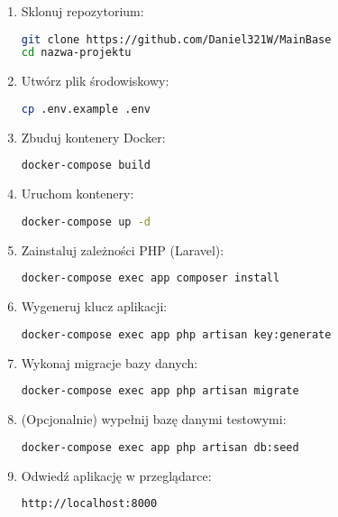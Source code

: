\documentclass[a4paper,12pt]{article}
\begin{document}
\begin{enumerate}
  \item Sklonuj repozytorium:
\begin{lstlisting}[language=bash]
git clone https://github.com/Daniel321W/MainBase
cd nazwa-projektu
\end{lstlisting}

  \item Utwórz plik środowiskowy:
\begin{lstlisting}[language=bash]
cp .env.example .env
\end{lstlisting}

  \item Zbuduj kontenery Docker:
\begin{lstlisting}[language=bash]
docker-compose build
\end{lstlisting}

  \item Uruchom kontenery:
\begin{lstlisting}[language=bash]
docker-compose up -d
\end{lstlisting}

  \item Zainstaluj zależności PHP (Laravel):
\begin{lstlisting}[language=bash]
docker-compose exec app composer install
\end{lstlisting}

  \item Wygeneruj klucz aplikacji:
\begin{lstlisting}[language=bash]
docker-compose exec app php artisan key:generate
\end{lstlisting}

  \item Wykonaj migracje bazy danych:
\begin{lstlisting}[language=bash]
docker-compose exec app php artisan migrate
\end{lstlisting}

  \item (Opcjonalnie) wypełnij bazę danymi testowymi:
\begin{lstlisting}[language=bash]
docker-compose exec app php artisan db:seed
\end{lstlisting}

  \item Odwiedź aplikację w przeglądarce:
\begin{lstlisting}[language=bash]
http://localhost:8000
\end{lstlisting}
\end{enumerate}
\end{document}
